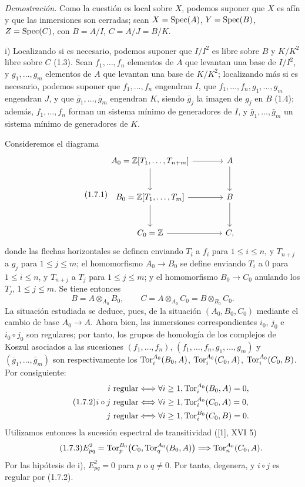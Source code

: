 \emph{Demostración.} Como la cuestión es local sobre $X$, podemos suponer que $X$ es afín y que las inmersiones son cerradas; sean $X=\operatorname{Spec}(A)$, $Y=\operatorname{Spec}(B)$, $Z=\operatorname{Spec}(C)$, con $B=A/I$, $C=A/J=B/K$.

i) Localizando si es necesario, podemos suponer que $I/I^2$ es libre sobre $B$ y $K/K^2$ libre sobre $C$ (1.3). Sean $f_1,\ldots,f_n$ elementos de $A$ que levantan una base de $I/I^2$, y $g_1,\ldots,g_m$ elementos de $A$ que levantan una base de $K/K^2$; localizando más si es necesario, podemos suponer que $f_1,\ldots,f_n$ engendran $I$, que $f_1,\ldots,f_n,g_1,\ldots,g_m$ engendran $J$, y que $\bar g_1,\ldots,\bar g_m$ engendran $K$, siendo $\bar g_j$ la imagen de $g_j$ en $B$ (1.4); además, $f_1,\ldots,f_n$ forman un sistema mínimo de generadores de $I$, y $\bar g_1,\ldots,\bar g_m$ un sistema mínimo de generadores de $K$.

Consideremos el diagrama
\begin{equation}\tag{1.7.1}
\begin{tikzcd}[column sep=large,row sep=large]
A_0=\mathbb Z[T_1,\ldots,T_{n+m}] \arrow[r] \arrow[d] & A \arrow[d]\\
B_0=\mathbb Z[T_1,\ldots,T_m] \arrow[r] \arrow[d] & B \arrow[d]\\
C_0=\mathbb Z \arrow[r] & C,
\end{tikzcd}
\end{equation}
donde las flechas horizontales se definen enviando $T_i$ a $f_i$ para $1\leq i\leq n$, y $T_{n+j}$ a $g_j$ para $1\leq j\leq m$; el homomorfismo $A_0\longrightarrow B_0$ se define enviando $T_i$ a $0$ para $1\leq i\leq n$, y $T_{n+j}$ a $T_j$ para $1\leq j\leq m$; y el homomorfismo $B_0\longrightarrow C_0$ anulando los $T_j$, $1\leq j\leq m$. Se tiene entonces
\[
 B=A\otimes_{A_0}B_0,
 \qquad
 C=A\otimes_{A_0}C_0=B\otimes_{B_0}C_0.
\]
La situación estudiada se deduce, pues, de la situación $(A_0,B_0,C_0)$ mediante el cambio de base $A_0\longrightarrow A$. Ahora bien, las inmersiones correspondientes $i_0$, $j_0$ e $i_0\circ j_0$ son regulares; por tanto, los grupos de homología de los complejos de Koszul asociados a las sucesiones $(f_1,\ldots,f_n)$, $(f_1,\ldots,f_n,g_1,\ldots,g_m)$ y $(\bar g_1,\ldots,\bar g_m)$ son respectivamente los $\operatorname{Tor}_i^{A_0}(B_0,A)$, $\operatorname{Tor}_i^{A_0}(C_0,A)$, $\operatorname{Tor}_i^{A_0}(C_0,B)$. Por consiguiente:
\begin{equation}\tag{1.7.2}
\begin{aligned}
 i\ \text{regular} &\Longleftrightarrow \forall i\geq1,
 \operatorname{Tor}_i^{A_0}(B_0,A)=0,\\
 i\circ j\ \text{regular} &\Longleftrightarrow \forall i\geq1,
 \operatorname{Tor}_i^{A_0}(C_0,A)=0,\\
 j\ \text{regular} &\Longleftrightarrow \forall i\geq1,
 \operatorname{Tor}_i^{B_0}(C_0,B)=0.
\end{aligned}
\end{equation}
Utilizamos entonces la sucesión espectral de transitividad ([1], XVI 5)
\begin{equation}\tag{1.7.3}
E^2_{pq}=\operatorname{Tor}_p^{B_0}\bigl(C_0,\operatorname{Tor}_q^{A_0}(B_0,A)\bigr)
\Longrightarrow \operatorname{Tor}_n^{A_0}(C_0,A).
\end{equation}
Por las hipótesis de i), $E^2_{pq}=0$ para $p$ o $q\ne0$. Por tanto, degenera, y $i\circ j$ es regular por (1.7.2).

